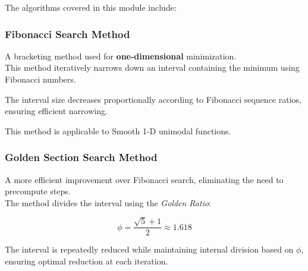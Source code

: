 \documentclass[
  letterpaper,
  DIV=11,
  numbers=noendperiod]{scrreprt}
\begin{document}
The algorithms covered in this module include:

\subsubsection{Fibonacci Search Method}\label{fibonacci-search-method}

A bracketing method used for \textbf{one-dimensional} minimization.\\
This method iteratively narrows down an interval containing the minimum
using Fibonacci numbers.

\begin{tcolorbox}[enhanced jigsaw, leftrule=.75mm, rightrule=.15mm, colback=white, colbacktitle=quarto-callout-note-color!10!white, arc=.35mm, opacityback=0, toptitle=1mm, bottomrule=.15mm, bottomtitle=1mm, titlerule=0mm, title=\textcolor{quarto-callout-note-color}{\faInfo}\hspace{0.5em}{Key Concept}, toprule=.15mm, left=2mm, coltitle=black, breakable, colframe=quarto-callout-note-color-frame, opacitybacktitle=0.6]

The interval size decreases proportionally according to Fibonacci
sequence ratios, ensuring efficient narrowing.

This method is applicable to Smooth 1-D unimodal functions.

\end{tcolorbox}

\subsubsection{Golden Section Search
Method}\label{golden-section-search-method}

A more efficient improvement over Fibonacci search, eliminating the need
to precompute steps.\\
The method divides the interval using the \emph{Golden Ratio}:

\[
\phi = \frac{\sqrt{5} + 1}{2} \approx 1.618
\]

\begin{tcolorbox}[enhanced jigsaw, leftrule=.75mm, rightrule=.15mm, colback=white, colbacktitle=quarto-callout-note-color!10!white, arc=.35mm, opacityback=0, toptitle=1mm, bottomrule=.15mm, bottomtitle=1mm, titlerule=0mm, title=\textcolor{quarto-callout-note-color}{\faInfo}\hspace{0.5em}{Key Concept}, toprule=.15mm, left=2mm, coltitle=black, breakable, colframe=quarto-callout-note-color-frame, opacitybacktitle=0.6]

The interval is repeatedly reduced while maintaining internal division
based on \(\phi\), ensuring optimal reduction at each iteration.

\end{tcolorbox}
\end{document}
